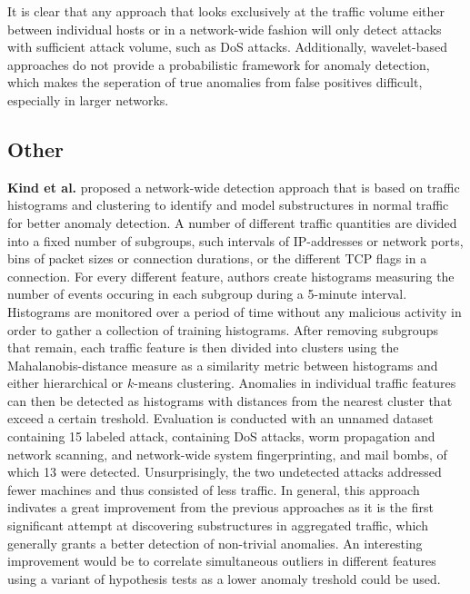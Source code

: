 \documentclass[a4paper,12pt,twoside]{report}
\begin{document}
It is clear that any approach that looks exclusively at the traffic volume either between individual hosts or in a network-wide fashion will only detect attacks with sufficient attack volume, such as DoS attacks. Additionally, wavelet-based approaches do not provide a probabilistic framework for anomaly detection, which makes the seperation of true anomalies from false positives difficult, especially in larger networks. 


\subsection{Other}

\textbf{Kind et al.} \cite{kind2009histogram} proposed a network-wide detection approach that is based on traffic histograms and clustering to identify and model substructures in normal traffic for better anomaly detection. A number of different traffic quantities are divided into a fixed number of subgroups, such intervals of IP-addresses or network ports, bins of packet sizes or connection durations, or the different TCP flags in a connection. For every different feature, authors create histograms measuring the number of events occuring in each subgroup during a 5-minute interval. Histograms are monitored over a period of time without any malicious activity in order to gather a collection of training histograms. After removing subgroups that remain, each traffic feature is then divided into clusters using the Mahalanobis-distance measure as a similarity metric between histograms and either hierarchical or $k$-means clustering. Anomalies in individual traffic features can then be detected as histograms with distances from the nearest cluster that exceed a certain treshold. Evaluation is conducted with an unnamed dataset containing 15 labeled attack, containing DoS attacks, worm propagation and network scanning, and network-wide system fingerprinting, and mail bombs, of which 13 were detected. Unsurprisingly, the two undetected attacks addressed fewer machines and thus consisted of less traffic. In general, this approach indivates a great improvement from the previous approaches as it is the first significant attempt at discovering substructures in aggregated traffic, which generally grants a better detection of non-trivial anomalies. An interesting improvement would be to correlate simultaneous outliers in different features using a variant of hypothesis tests as a lower anomaly treshold could be used.
\end{document}
